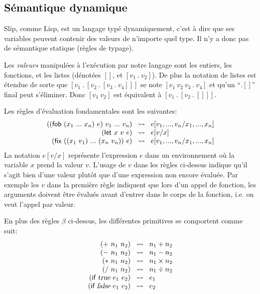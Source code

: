 \documentclass{article}
\begin{document}
\subsection{Sémantique dynamique}

Slip, comme Lisp, est un langage typé dynamiquement, c'est à dire que ses
variables peuvent contenir des valeurs de n'importe quel type.  Il n'y
a donc pas de sémantique statique (règles de typage).

Les \emph{valeurs} manipulées à l'exécution par notre langage sont les entiers, les
fonctions, et les listes (dénotées $[]$, et $[v_1~.~v_2]$).  De plus la
notation de listes est étendue de sorte que $[v_1~.~[v_2~.~[v_3~.~v_4]]]$ se
note $[v_1~v_2~v_3~.~v_4]$ et qu'un ``$. []$'' final peut s'éliminer.
Donc $[v_1~v_2]$ est équivalent à $[v_1~.~[v_2~.~[]]]$.

Les règles d'évaluation fondamentales sont les suivantes:
\begin{displaymath}
  \begin{array}{r@{\;\;\;\leadsto\;\;\;}l}
    ((\kw{fob}~(x_1~...~x_n)~e)~v_1~...~v_n) & e[v_1,...,v_n/x_1,...,x_n] \\
    (\kw{let}~x~v~e) & e[v/x] \\
    (\kw{fix}~((x_1~v_1)~...~(x_n~v_n))~e) & e[v_1,...,v_n/x_1,...,x_n]
  \end{array}
\end{displaymath}
La notation $e[v/x]$ représente l'expression $e$ dans un environnement où la
variable $x$ prend la valeur $v$.  L'usage de $v$ dans les règles ci-dessus
indique qu'il s'agit bien d'une valeur plutôt que d'une expression non
encore évaluée.  Par exemple les $v$ dans la première règle indiquent que
lors d'un appel de fonction, les arguments doivent être évalués avant
d'entrer dans le corps de la fonction, i.e. on veut l'appel par valeur.

En plus des règles $\beta$ ci-dessus, les différentes primitives se
comportent comme suit:
\begin{displaymath}
  \begin{array}{r@{\;\;\;\leadsto\;\;\;}l}
    (+~n_1~n_2) & n_1 + n_2 \\
    (-~n_1~n_2) & n_1 - n_2 \\
    (*~n_1~n_2) & n_1 \times n_2 \\
    (/~n_1~n_2) & n_1 \div n_2 \\
    (\kw{if}~\id{true}~e_1~e_2) & e_1 \\
    (\kw{if}~\id{false}~e_1~e_2) & e_2 \\
  \end{array}
\end{displaymath}
\end{document}
